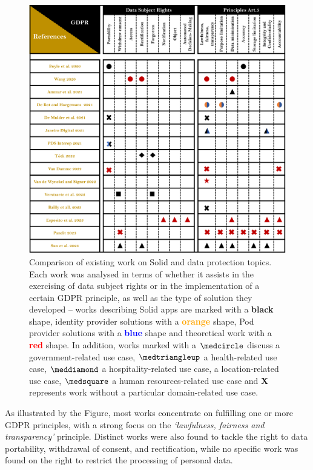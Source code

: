 \begin{figure}[htp]
\caption[Comparison of existing work on Solid and data protection topics.]{Comparison of existing work on Solid and data protection topics. Each work was analysed in terms of whether it assists in the exercising of data subject rights or in the implementation of a certain GDPR principle, as well as the type of solution they developed -- works describing Solid apps are marked with a \textbf{black} shape, identity provider solutions with a \textbf{\textcolor{orange}{orange}} shape, Pod provider solutions with a \textbf{\textcolor{blue}{blue}} shape and theoretical work with a \textbf{\textcolor{red}{red}} shape. In addition, works marked with a $\medcircle$ discuss a government-related use case, $\medtriangleup$ a health-related use case, $\meddiamond$ a hospitality-related use case, \faStarO\space a location-related use case, $\medsquare$ a human resources-related use case and \textbf{X} represents work without a particular domain-related use case.}
\label{fig:solid_sota}
\centering
\includegraphics[width=\textwidth]{figures/chapter-2/solid-sota.png}
\end{figure}

As illustrated by the Figure, most works concentrate on fulfilling one or more GDPR principles, with a strong focus on the \textit{`lawfulness, fairness and transparency'} principle.
Distinct works were also found to tackle the right to data portability, withdrawal of consent, and rectification, while no specific work was found on the right to restrict the processing of personal data.

